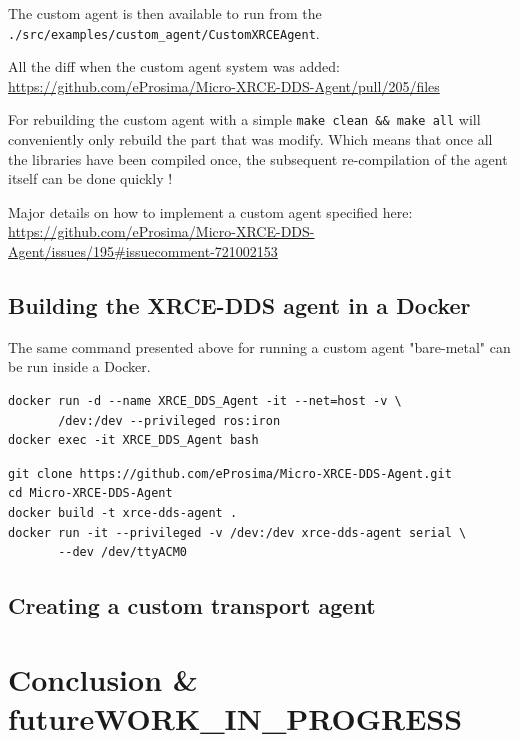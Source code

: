 \documentclass[10pt]{article}
\begin{document}
The custom agent is then available to run from the \texttt{./src/examples/custom\_agent/CustomXRCEAgent}.

All the diff when the custom agent system was added:
\url{https://github.com/eProsima/Micro-XRCE-DDS-Agent/pull/205/files}

For rebuilding the custom agent with a simple \texttt{make clean \&\& make all} will
conveniently only rebuild the part that was modify.
Which means that once all the libraries have been compiled once,
the subsequent re-compilation of the agent itself can be done quickly !

Major details on how to implement a custom agent specified here:
\url{https://github.com/eProsima/Micro-XRCE-DDS-Agent/issues/195\#issuecomment-721002153}


\subsection{Building the XRCE-DDS agent in a Docker}
\label{sec:org714ca07}
The same command presented above for running a custom agent "bare-metal" can be
run inside a Docker.

\begin{verbatim}
docker run -d --name XRCE_DDS_Agent -it --net=host -v \
       /dev:/dev --privileged ros:iron
docker exec -it XRCE_DDS_Agent bash
\end{verbatim}


\begin{verbatim}
git clone https://github.com/eProsima/Micro-XRCE-DDS-Agent.git
cd Micro-XRCE-DDS-Agent
docker build -t xrce-dds-agent .
docker run -it --privileged -v /dev:/dev xrce-dds-agent serial \
       --dev /dev/ttyACM0
\end{verbatim}


\subsection{Creating a custom transport agent}
\label{sec:orgdba7f3f}


\pagebreak


\section{Conclusion \& future\hfill{}\textsc{WORK\_IN\_PROGRESS}}
\label{sec:orgcf9cdbf}
\end{document}
